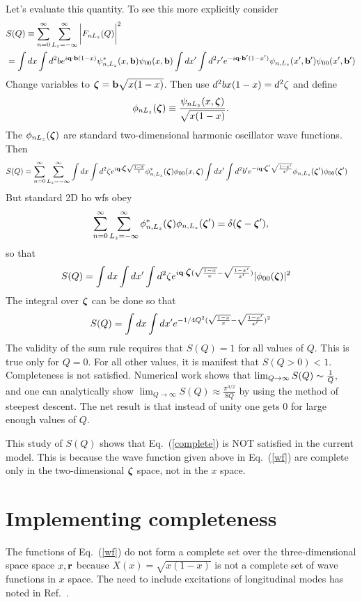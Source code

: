 \documentclass[aps,prd,amsmath,longbibliography]{revtex4-1}
\newcommand{\eq}[1]{Eq.~(\ref{#1})}
\newcommand{\bfzeta}{\mbox{\boldmath$\zeta$}}
\def\bea{\begin{eqnarray}}
\def\eea{\end{eqnarray}}\def\a{\alpha}\newcommand{\bfk}{{\bf k}}\newcommand{\bfq}{{\bf q}}
\begin{document}
{Let's evaluate this quantity. 
    To see this more explicitly consider
  \bea& S(Q)\equiv \sum_{n=0}^\infty\sum_{L_z=-\infty}^\infty  \bigg|F_{nL_z}(Q) \bigg|^2 \\&=\int dx\int d^2b e^{i\bfq\cdot\bfb(1-x)}\psi_{n,L_z}^*(x,\bfb)\psi_{00}(x,\bfb) 
 \int dx'\int d^2r' e^{-i\bfq\cdot\bfb'(1-x')}\psi_{n,L_z}(x',\bfb')\psi_{00}(x',\bfb') 
\eea
  Change variables to $\bfzeta =\bfb\sqrt{x(1-x)}$. Then  use $d^2b x(1-x)= d^2\zeta$ and define
  \bea \phi_{nL_z}(\bfzeta)\equiv {\psi_{nL_z}(x,\bfzeta)\over \sqrt{x(1-x)}}.\eea
  The $\phi_{nL_z}(\bfzeta)$ are standard two-dimensional harmonic oscillator wave functions.
   Then
  \bea &S(Q)=\sum_{n=0}^\infty\sum_{L_z=-\infty}^\infty \int dx\int d^2\zeta e^{i\bfq\cdot\bfzeta\sqrt{1-x\over x}}\phi_{n,L_z}^*(\bfzeta)\phi_{00}(x,\bfzeta) 
 \int dx'\int d^2b' e^{-i\bfq\cdot\bfzeta'\sqrt{1-x'\over x'}}\phi_{n,L_z}(\bfzeta')\phi_{00}(\bfzeta') 
\eea
But  standard 2D ho wfs obey
\bea \sum_{n=0}^\infty\sum_{L_z=-\infty}^\infty \phi_{n,L_z}^*(\bfzeta) \phi_{n,L_z}(\bfzeta')=\d(\bfzeta-\bfzeta'),\eea
so that
  \bea &S(Q) = \int dx\int dx' \int d^2\zeta e^{i\bfq\cdot\bfzeta(\sqrt{1-x\over x}-\sqrt{1-x'\over x'})} |\phi_{00}(\bfzeta)|^2\eea
The integral over $\bfzeta$ can be done so that
\bea S(Q)=\int dx\int dx' e^{- 1/4 Q^2 (\sqrt{1-x\over x}-\sqrt{1-x'\over x'})^2}\label{SQ}\eea
The validity of the sum rule requires that $S(Q)=1 $ for all values of $Q$. This is true only for $Q=0$. For all other values, it is manifest that $S(Q>0)<1$. Completeness is not satisfied.
Numerical work shows that $\lim_{Q\to \infty}S(Q)\sim {1\over Q },$
and  one can analytically show $\lim_{Q\to \infty}S(Q)\approx\frac{\pi ^{3/2}}{8 Q}$  by using the method of steepest descent. The net result is that 
 instead of unity one gets 0 for large enough values of $Q$.

This study of $S(Q)$ shows that 
 \eq{complete} is NOT satisfied in the current model. This is because the wave function given above  in \eq{wf}  are complete only in the two-dimensional  $\bfzeta$ space, not in the $x$ space.
\section{Implementing completeness}

The functions of \eq{wf} do not form a complete set over the three-dimensional space space $x,{\bf r}$ because $X(x)=\sqrt{x(1-x)}$ is not a complete set of wave functions in $x$ space.  The need to include excitations of longitudinal modes has  noted in 
Ref.~\cite{Li:2015zda}.

}
\end{document}
